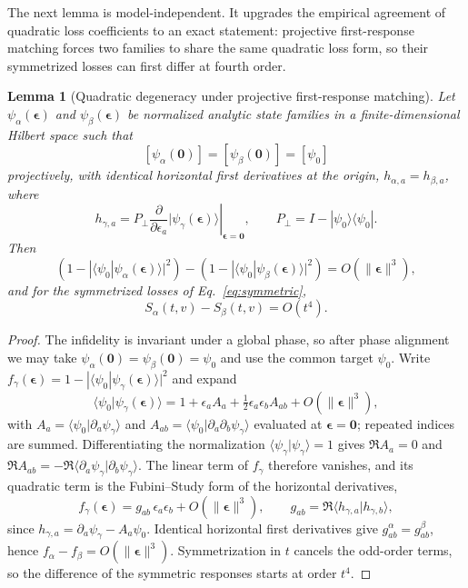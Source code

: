 \documentclass[11pt]{article}
\newtheorem{lemma}{Lemma}
\begin{document}
The next lemma is model-independent. It upgrades the empirical agreement of
quadratic loss coefficients to an exact statement: projective first-response
matching forces two families to share the same quadratic loss form, so their
symmetrized losses can first differ at fourth order.

\begin{lemma}[Quadratic degeneracy under projective first-response matching]
\label{lem:quaddeg}
Let $\psi_\alpha(\boldsymbol{\epsilon})$ and
$\psi_\beta(\boldsymbol{\epsilon})$ be normalized analytic state families in
a finite-dimensional Hilbert space such that
\[
[\psi_\alpha(\mathbf{0})]=[\psi_\beta(\mathbf{0})]=[\psi_0]
\]
projectively, with identical horizontal first derivatives at the origin,
$h_{\alpha,a}=h_{\beta,a}$, where
\[
h_{\gamma,a}
=
P_\perp
\left.
\frac{\partial}{\partial\epsilon_a}
|\psi_\gamma(\boldsymbol{\epsilon})\rangle
\right|_{\boldsymbol{\epsilon}=\mathbf{0}},
\qquad
P_\perp=I-|\psi_0\rangle\langle\psi_0|.
\]
Then
\[
\left(1-|\langle\psi_0|\psi_\alpha(\boldsymbol{\epsilon})\rangle|^{2}\right)
-
\left(1-|\langle\psi_0|\psi_\beta(\boldsymbol{\epsilon})\rangle|^{2}\right)
=
O(\|\boldsymbol{\epsilon}\|^{3}),
\]
and for the symmetrized losses of Eq.~\eqref{eq:symmetric},
\[
S_\alpha(t,v)-S_\beta(t,v)=O(t^{4}).
\]
\end{lemma}

\begin{proof}
The infidelity is invariant under a global phase, so after phase alignment
we may take $\psi_\alpha(\mathbf{0})=\psi_\beta(\mathbf{0})=\psi_0$ and use
the common target $\psi_0$. Write
$f_\gamma(\boldsymbol{\epsilon})
=1-|\langle\psi_0|\psi_\gamma(\boldsymbol{\epsilon})\rangle|^{2}$ and expand
\[
\langle\psi_0|\psi_\gamma(\boldsymbol{\epsilon})\rangle
=
1+\epsilon_a A_a+\tfrac12\epsilon_a\epsilon_b A_{ab}
+O(\|\boldsymbol{\epsilon}\|^{3}),
\]
with $A_a=\langle\psi_0|\partial_a\psi_\gamma\rangle$ and
$A_{ab}=\langle\psi_0|\partial_a\partial_b\psi_\gamma\rangle$ evaluated at
$\boldsymbol{\epsilon}=\mathbf{0}$; repeated indices are summed.
Differentiating the normalization
$\langle\psi_\gamma|\psi_\gamma\rangle=1$ gives $\Re A_a=0$ and
$\Re A_{ab}=-\Re\langle\partial_a\psi_\gamma|\partial_b\psi_\gamma\rangle$.
The linear term of $f_\gamma$ therefore vanishes, and its quadratic term is
the Fubini--Study form of the horizontal derivatives,
\[
f_\gamma(\boldsymbol{\epsilon})
=
g_{ab}\,\epsilon_a\epsilon_b+O(\|\boldsymbol{\epsilon}\|^{3}),
\qquad
g_{ab}
=
\Re\langle h_{\gamma,a}|h_{\gamma,b}\rangle,
\]
since $h_{\gamma,a}=\partial_a\psi_\gamma-A_a\psi_0$. Identical horizontal
first derivatives give $g^{\alpha}_{ab}=g^{\beta}_{ab}$, hence
$f_\alpha-f_\beta=O(\|\boldsymbol{\epsilon}\|^{3})$. Symmetrization in $t$
cancels the odd-order terms, so the difference of the symmetric responses
starts at order $t^{4}$.
\end{proof}
\end{document}
